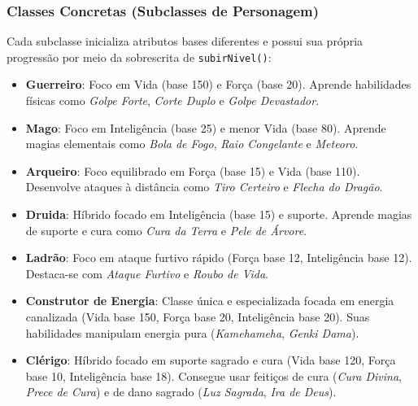 \documentclass[12pt,a4paper]{article}
\begin{document}
\subsubsection{Classes Concretas (Subclasses de Personagem)}
Cada subclasse inicializa atributos bases diferentes e possui sua própria progressão por meio da sobrescrita de \texttt{subirNivel()}:
\begin{itemize}
    \item \textbf{Guerreiro}: Foco em Vida (base 150) e Força (base 20). Aprende habilidades físicas como \textit{Golpe Forte}, \textit{Corte Duplo} e \textit{Golpe Devastador}.
    \item \textbf{Mago}: Foco em Inteligência (base 25) e menor Vida (base 80). Aprende magias elementais como \textit{Bola de Fogo}, \textit{Raio Congelante} e \textit{Meteoro}.
    \item \textbf{Arqueiro}: Foco equilibrado em Força (base 15) e Vida (base 110). Desenvolve ataques à distância como \textit{Tiro Certeiro} e \textit{Flecha do Dragão}.
    \item \textbf{Druida}: Híbrido focado em Inteligência (base 15) e suporte. Aprende magias de suporte e cura como \textit{Cura da Terra} e \textit{Pele de Árvore}.
    \item \textbf{Ladrão}: Foco em ataque furtivo rápido (Força base 12, Inteligência base 12). Destaca-se com \textit{Ataque Furtivo} e \textit{Roubo de Vida}.
    \item \textbf{Construtor de Energia}: Classe única e especializada focada em energia canalizada (Vida base 150, Força base 20, Inteligência base 20). Suas habilidades manipulam energia pura (\textit{Kamehameha}, \textit{Genki Dama}).
    \item \textbf{Clérigo}: Híbrido focado em suporte sagrado e cura (Vida base 120, Força base 10, Inteligência base 18). Consegue usar feitiços de cura (\textit{Cura Divina}, \textit{Prece de Cura}) e de dano sagrado (\textit{Luz Sagrada}, \textit{Ira de Deus}).
\end{itemize}
\end{document}
